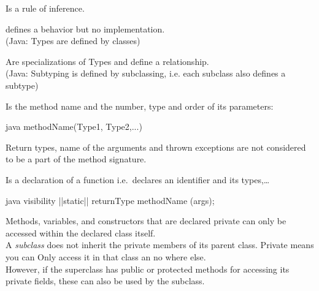\begin{defnbox}\nospacing
  \begin{defn}[Resolution]
    Is a rule of inference.
  \end{defn}
\end{defnbox}
\begin{defnbox}\nospacing
  \begin{defn}[Type]\label{defn:Type}
    defines a behavior but no implementation.\\
    (Java: Types are defined by classes)
  \end{defn}
\end{defnbox}
\begin{defnbox}\nospacing
  \begin{defn}[Subtyping]\label{defn:}
    Are specializations of Types and define a  relationship.\\
    (Java: Subtyping is defined by subclassing, i.e. each subclass also defines a subtype)
  \end{defn}
\end{defnbox}
\begin{defnbox}\nospacing
  \begin{defn}\label{defn:}
    Is the method name and the number, type and order of its parameters:
    \begin{mintlinebox}{java}
      methodName(Type1, Type2,...)
    \end{mintlinebox}
  \end{defn}
\end{defnbox}
\begin{notebox}[Note]\nospacing
  Return types, name of the arguments and thrown exceptions are not considered to be a part of the method signature. 
\end{notebox}
\begin{defnbox}\nospacing
  \begin{defn}\label{defn:methodDeclaration}
  Is a declaration of a function i.e.\ declares an identifier and its types,\ldots
    \begin{mintlinebox}{java}
      visibility |\optal|static|\optar| returnType methodName (args);
    \end{mintlinebox}
  \end{defn}
\end{defnbox}
\begin{defnbox}\nospacing
  \begin{defn}[Private]\label{defn:private}
    Methods, variables, and constructors that are declared private can only be
    accessed within the declared class itself.\\
    A \textit{subclass} does not inherit the private members of its parent
    class.
    Private means you can Only access it in that class an no where else.\\
    However, if the superclass has public or protected methods for accessing its
    private fields, these can also be used by the subclass.
  \end{defn}
\end{defnbox}
